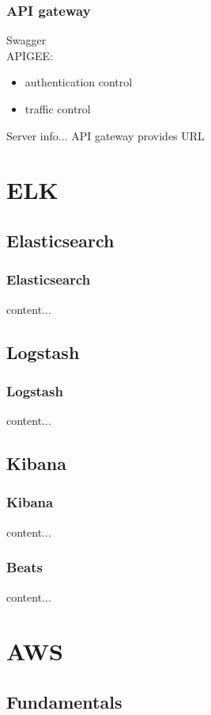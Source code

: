 \documentclass{beamer}
\begin{document}
\begin{frame}\frametitle{API gateway}
	Swagger\\
	APIGEE:\\
	\begin{itemize}
		\item authentication control
		\item traffic control
	\end{itemize}
	Server info... API gateway provides URL
\end{frame}







\section{ELK}
\subsection{Elasticsearch}
\begin{frame}\frametitle{Elasticsearch}
	content...
\end{frame}

\subsection{Logstash}
\begin{frame}\frametitle{Logstash}
	content...
\end{frame}


\subsection{Kibana}

\begin{frame}\frametitle{Kibana}
	content...
\end{frame}

\begin{frame}\frametitle{Beats}
content...
\end{frame}





\section{AWS}
\subsection{Fundamentals}
\end{document}
